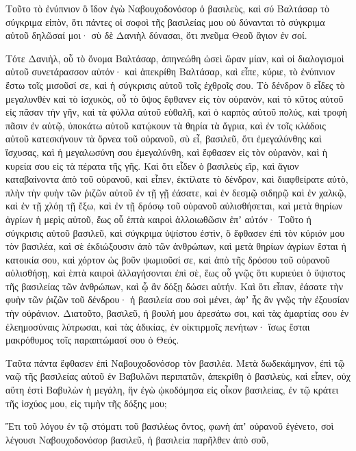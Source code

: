 {Τοῦτο τὸ ἐνύπνιον ὃ ἴδον ἐγὼ Ναβουχοδονόσορ ὁ βασιλεὺς, καὶ σύ Βαλτάσαρ τὸ σύγκριμα εἰπὸν, ὅτι πάντες οἱ σοφοὶ τῆς βασιλείας μου οὐ δύνανται τὸ σύγκριμα αὐτοῦ δηλῶσαί μοι· σὺ δὲ Δανιὴλ δύνασαι, ὅτι πνεῦμα Θεοῦ ἅγιον ἐν σοί.
\par }{\PP {}Τότε Δανιὴλ, οὗ τὸ ὄνομα Βαλτάσαρ, ἀπηνεώθη ὡσεὶ ὥραν μίαν, καὶ οἱ διαλογισμοὶ αὐτοῦ συνετάρασσον αὐτόν· καὶ ἀπεκρίθη Βαλτάσαρ, καὶ εἶπε, κύριε, τὸ ἐνύπνιον ἔστω τοῖς μισοῦσί σε, καὶ ἡ σύγκρισις αὐτοῦ τοῖς ἐχθροῖς σου.
Τὸ δένδρον ὃ εἶδες τὸ μεγαλυνθὲν καὶ τὸ ἰσχυκὸς, οὗ τὸ ὕψος ἔφθανεν εἰς τὸν οὐρανὸν, καὶ τὸ κῦτος αὐτοῦ εἰς πᾶσαν τὴν γῆν,
καὶ τὰ φύλλα αὐτοῦ εὐθαλῆ, καὶ ὁ καρπὸς αὐτοῦ πολύς, καὶ τροφὴ πᾶσιν ἐν αὐτῷ, ὑποκάτω αὐτοῦ κατῴκουν τὰ θηρία τὰ ἄγρια, καὶ ἐν τοῖς κλάδοις αὐτοῦ κατεσκήνουν τὰ ὄρνεα τοῦ οὐρανοῦ,
σὺ εἶ, βασιλεῦ, ὅτι ἐμεγαλύνθης καὶ ἴσχυσας, καὶ ἡ μεγαλωσύνη σου ἐμεγαλύνθη, καὶ ἔφθασεν εἰς τὸν οὐρανὸν, καὶ ἡ κυρεία σου εἰς τὰ πέρατα τῆς γῆς.
Καὶ ὅτι εἶδεν ὁ βασιλεὺς εἲρ, καὶ ἅγιον καταβαίνοντα ἀπὸ τοῦ οὐρανοῦ, καὶ εἶπεν, ἐκτίλατε τὸ δένδρον, καὶ διαφθείρατε αὐτὸ, πλὴν τὴν φυὴν τῶν ῥιζῶν αὐτοῦ ἐν τῇ γῇ ἐάσατε, καὶ ἐν δεσμῷ σιδηρῷ καὶ ἐν χαλκῷ, καὶ ἐν τῇ χλόῃ τῇ ἔξω, καὶ ἐν τῇ δρόσῳ τοῦ οὐρανοῦ αὐλισθήσεται, καὶ μετὰ θηρίων ἀγρίων ἡ μερὶς αὐτοῦ, ἕως οὗ ἑπτὰ καιροὶ ἀλλοιωθῶσιν ἐπʼ αὐτόν·
Τοῦτο ἡ σύγκρισις αὐτοῦ βασιλεῦ, καὶ σύγκριμα ὑψίστου ἐστὶν, ὃ ἔφθασεν ἐπὶ τὸν κύριόν μου τὸν βασιλέα,
καὶ σὲ ἐκδιώξουσιν ἀπὸ τῶν ἀνθρώπων, καὶ μετὰ θηρίων ἀγρίων ἔσται ἡ κατοικία σου, καὶ χόρτον ὡς βοῦν ψωμιοῦσί σε, καὶ ἀπὸ τῆς δρόσου τοῦ οὐρανοῦ αὐλισθήσῃ, καὶ ἑπτὰ καιροὶ ἀλλαγήσονται ἐπὶ σὲ, ἕως οὗ γνῷς ὅτι κυριεύει ὁ ὕψιστος τῆς βασιλείας τῶν ἀνθρώπων, καὶ ᾧ ἂν δόξῃ δώσει αὐτήν.
Καὶ ὅτι εἶπαν, ἐάσατε τὴν φυὴν τῶν ῥιζῶν τοῦ δένδρου· ἡ βασιλεία σου σοὶ μένει, ἀφʼ ἧς ἂν γνῷς τὴν ἐξουσίαν τὴν οὐράνιον.
Διατοῦτο, βασιλεῦ, ἡ βουλή μου ἀρεσάτω σοι, καὶ τὰς ἁμαρτίας σου ἐν ἐλεημοσύναις λύτρωσαι, καὶ τὰς ἀδικίας, ἐν οἰκτιρμοῖς πενήτων· ἴσως ἔσται μακρόθυμος τοῖς παραπτώμασί σου ὁ Θεός.
\par }{\PP {}Ταῦτα πάντα ἔφθασεν ἐπὶ Ναβουχοδονόσορ τὸν βασιλέα.
Μετὰ δωδεκάμηνον, ἐπὶ τῷ ναῷ τῆς βασιλείας αὐτοῦ ἐν Βαβυλῶνι περιπατῶν,
ἀπεκρίθη ὁ βασιλεὺς, καὶ εἶπεν, οὐχ αὕτη ἐστὶ Βαβυλὼν ἡ μεγάλη, ἣν ἐγὼ ᾠκοδόμησα εἰς οἶκον βασιλείας, ἐν τῷ κράτει τῆς ἰσχύος μου, εἰς τιμὴν τῆς δόξης μου;
\par }{\PP {}Ἔτι τοῦ λόγου ἐν τῷ στόματι τοῦ βασιλέως ὄντος, φωνὴ ἀπʼ οὐρανοῦ ἐγένετο, σοὶ λέγουσι Ναβουχοδονόσορ βασιλεῦ, ἡ βασιλεία παρῆλθεν ἀπὸ σοῦ,
}
